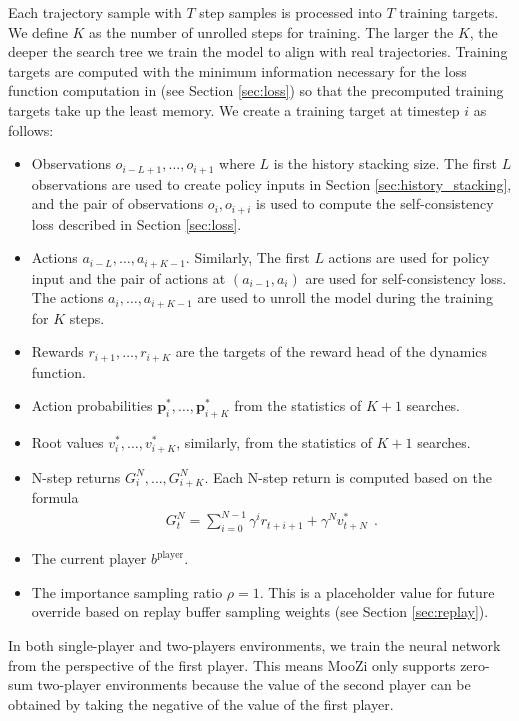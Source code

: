 Each trajectory sample with $T$ step samples is processed into $T$ training targets.
We define $K$ as the number of unrolled steps for training.
The larger the $K$, the deeper the search tree we train the model to align with real trajectories.
Training targets are computed with the minimum information necessary for the loss function computation in (see Section \ref{sec:loss}) so that the precomputed training targets take up the least memory.
We create a training target at timestep $i$ as follows:
\begin{itemize}
    \item Observations $o_{i - L + 1}, \dots, o_{i + 1}$ where $L$ is the history stacking size.
          The first $L$ observations are used to create policy inputs in Section \ref{sec:history_stacking},
          and the pair of observations $o_{i}, o_{i+i}$ is used to compute the self-consistency loss described in Section \ref{sec:loss}.

    \item Actions $a_{i - L}, \dots, a_{i + K - 1}$.
          Similarly, The first $L$ actions are used for policy input and the pair of actions at $(a_{i - 1}, a_{i})$ are used for self-consistency loss.
          The actions $a_{i}, \dots, a_{i + K - 1}$ are used to unroll the model during the training for $K$ steps.

    \item Rewards $r_{i + 1}, \dots, r_{i + K}$ are the targets of the reward head of the dynamics function.

    \item Action probabilities $\mathbf{p}^*_{i}, \dots, \mathbf{p}^*_{i + K}$ from the statistics of $K + 1$ searches.

    \item Root values $v^*_i, \dots, v^*_{i + K}$, similarly, from the statistics of $K + 1$ searches.

    \item N-step returns $G^N_{i}, \dots, G^N_{i + K}$.
          Each N-step return is computed based on the formula
          \begin{align*}
              G^N_{t} = \sum_{i = 0}^{N - 1}{\gamma^i r_{t+i+1}} + \gamma^Nv^*_{t + N} ~~ .
          \end{align*}

    \item The current player $b^{\text{player}}$.

    \item The importance sampling ratio $\rho = 1$. This is a placeholder value for future override based on replay buffer sampling weights (see Section \ref{sec:replay}).
\end{itemize}
In both single-player and two-players environments, we train the neural network from the perspective of the first player.
This means MooZi only supports zero-sum two-player environments because the value of the second player can be obtained by taking the negative of the value of the first player.

